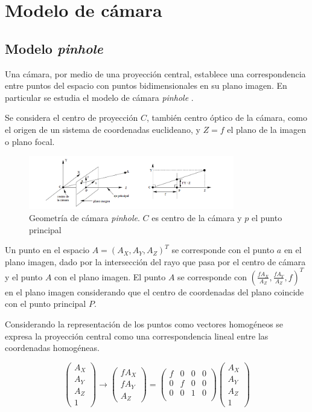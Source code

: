 ﻿\chapter{Modelo de cámara}

\section{Modelo \emph{pinhole}}

Una cámara, por medio de una proyección central, establece una correspondencia entre puntos del espacio con puntos bidimensionales en su plano imagen. En particular se estudia el modelo de cámara \emph{pinhole} \cite{LibroCompGrafica3}.

Se considera el centro de proyección $C$, también centro óptico de la cámara, como el origen de un sistema de coordenadas euclideano, y $Z = f$ el plano de la imagen o plano focal.

\begin{figure}[H]
  \centering
    \includegraphics[width=0.8\textwidth]{./Cap2_videomapping/pinhole.png}
  \caption[Multiple View Geometry in Computer Vision, Fig. 6.1]{Geometría de cámara \emph{pinhole}. $C$ es centro de la cámara y $p$ el punto principal}
  \label{fig:Calib-Pinhole}
\end{figure}

Un punto en el espacio $A=(A_X, A_Y, A_Z)^T$ se corresponde con el punto $a$ en el plano imagen, dado por la intersección del rayo que pasa por el centro de cámara y el punto $A$ con el plano imagen. El punto $A$ se corresponde con $(\frac{fA_X}{A_Z}, \frac{fA_Y}{A_Z}, f)^T$ en el plano imagen considerando que el centro de coordenadas del plano coincide con el punto principal $P$.

Considerando la representación de los puntos como vectores homogéneos se expresa la proyección central como una correspondencia lineal entre las coordenadas homogéneas.

\[
\begin{pmatrix}
A_X \\ A_Y \\ A_Z \\ 1
\end{pmatrix}
\to
\begin{pmatrix}
fA_X \\ fA_Y \\ A_Z
\end{pmatrix}
=
\begin{pmatrix}
f & 0 & 0 & 0 \\
0 & f & 0 & 0 \\
0 & 0 & 1 & 0 \\
\end{pmatrix}
\begin{pmatrix}
A_X \\ A_Y \\ A_Z \\ 1
\end{pmatrix}
\]

